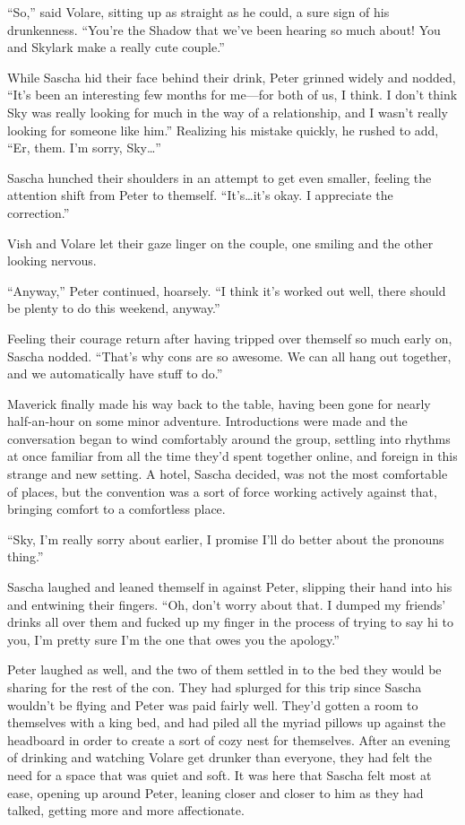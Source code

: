 ``So,'' said Volare, sitting up as straight as he could, a sure sign of his drunkenness. ``You're the Shadow that we've been hearing so much about! You and Skylark make a really cute couple.''

While Sascha hid their face behind their drink, Peter grinned widely and nodded, ``It's been an interesting few months for me---for both of us, I think. I don't think Sky was really looking for much in the way of a relationship, and I wasn't really looking for someone like him.'' Realizing his mistake quickly, he rushed to add, ``Er, them. I'm sorry, Sky\ldots{}''

Sascha hunched their shoulders in an attempt to get even smaller, feeling the attention shift from Peter to themself. ``It's\ldots{}it's okay. I appreciate the correction.''

Vish and Volare let their gaze linger on the couple, one smiling and the other looking nervous.

``Anyway,'' Peter continued, hoarsely. ``I think it's worked out well, there should be plenty to do this weekend, anyway.''

Feeling their courage return after having tripped over themself so much early on, Sascha nodded. ``That's why cons are so awesome. We can all hang out together, and we automatically have stuff to do.''

Maverick finally made his way back to the table, having been gone for nearly half-an-hour on some minor adventure. Introductions were made and the conversation began to wind comfortably around the group, settling into rhythms at once familiar from all the time they'd spent together online, and foreign in this strange and new setting. A hotel, Sascha decided, was not the most comfortable of places, but the convention was a sort of force working actively against that, bringing comfort to a comfortless place.

\secdiv{}

``Sky, I'm really sorry about earlier, I promise I'll do better about the pronouns thing.''

Sascha laughed and leaned themself in against Peter, slipping their hand into his and entwining their fingers. ``Oh, don't worry about that. I dumped my friends' drinks all over them and fucked up my finger in the process of trying to say hi to you, I'm pretty sure I'm the one that owes you the apology.''

Peter laughed as well, and the two of them settled in to the bed they would be sharing for the rest of the con. They had splurged for this trip since Sascha wouldn't be flying and Peter was paid fairly well. They'd gotten a room to themselves with a king bed, and had piled all the myriad pillows up against the headboard in order to create a sort of cozy nest for themselves. After an evening of drinking and watching Volare get drunker than everyone, they had felt the need for a space that was quiet and soft. It was here that Sascha felt most at ease, opening up around Peter, leaning closer and closer to him as they had talked, getting more and more affectionate.

